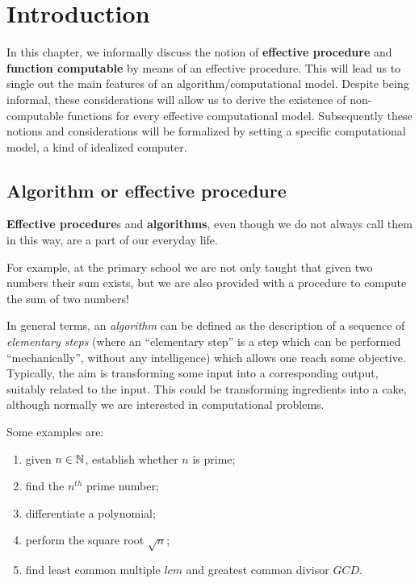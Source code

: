 \chapter{Introduction}\label{chap:intro}

In this chapter, we informally discuss the notion of \textbf{effective procedure} and \textbf{function computable} by means of an effective
procedure. This will lead us to single out the main features of an
algorithm/computational model.  Despite being informal, these
considerations will allow us to derive the existence of non-computable
functions for every effective computational model.
%
Subsequently these notions and
considerations will be formalized by setting a specific computational model,
a kind of idealized computer.

\section{Algorithm or effective procedure}

\textbf{Effective procedure}s and \textbf{algorithms}, even though we do not always call them in this way, are a part of our everyday life.

For example, at the primary school we are not only taught that given two numbers their sum exists, but we are also provided with a procedure to compute the sum of two numbers!

In general terms, an \emph{algorithm} can be defined as the
description of a sequence of \emph{elementary steps} (where an
``elementary step'' is a step which can be performed ``mechanically'', without
any intelligence) which allows one reach some objective.  Typically,
the aim is transforming some input into a corresponding output,
suitably related to the input.
%
This could be transforming ingredients into a cake, although normally
we are interested in computational problems.

\begin{example}
  Some examples are:
  \begin{enumerate}

  \item given $n \in \mathbb{N}$, establish whether $n$ is prime;
  \item find the $n^{th}$ prime number;
  \item differentiate a polynomial;
  \item perform the square root $\sqrt{n}$;
  \item find least common multiple $\mathit{lcm}$ and greatest common divisor $\mathit{GCD}$.
  \end{enumerate}
\end{example}

